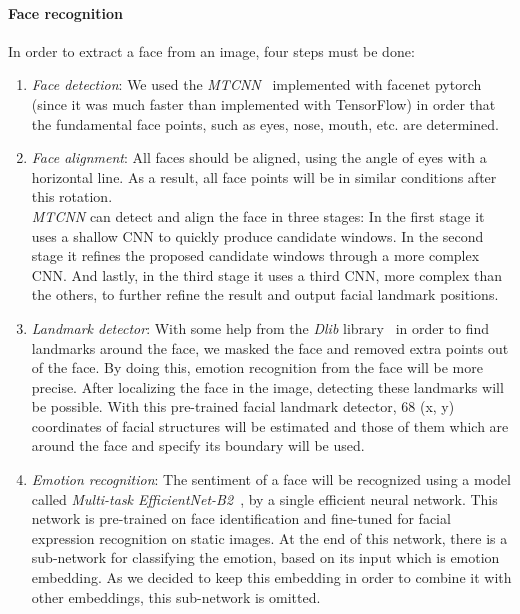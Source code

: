 \paragraph{Face recognition} In order to extract a face from an image, four steps must be done:

\begin{enumerate}
	\item\label{item:1}\emph{Face detection}: We used the \textit{MTCNN}~\cite{zhang2016joint} implemented with facenet pytorch (since it was much faster than implemented with TensorFlow) in order that the fundamental face points, such as eyes, nose, mouth, etc. are determined.
	\item\label{item:2}\emph{Face alignment}: All faces should be aligned, using the angle of eyes with a horizontal line. As a result, all face points will be in similar conditions after this rotation.\\\textit{MTCNN} can detect and align the face in three stages: In the first stage it uses a shallow CNN to quickly produce candidate windows. In the second stage it refines the proposed candidate windows through a more complex CNN. And lastly, in the third stage it uses a third CNN, more complex than the others, to further refine the result and output facial landmark positions.
	\item\label{item:3}\emph{Landmark detector}: With some help from the \textit{Dlib} library~\cite{kazemi2014one} in order to find landmarks around the face, we masked the face and removed extra points out of the face. By doing this, emotion recognition from the face will be more precise. After localizing the face in the image, detecting these landmarks will be possible. With this pre-trained facial landmark detector, 68 (x, y) coordinates of facial structures will be estimated and those of them which are around the face and specify its boundary will be used.
	\item\label{item:4}\emph{Emotion recognition}: The sentiment of a face will be recognized using a model called \textit{Multi-task EfficientNet-B2}~\cite{savchenko2022classifying}, by a single efficient neural network. This network is pre-trained on face identification and fine-tuned for facial expression recognition on static images. At the end of this network, there is a sub-network for classifying the emotion, based on its input which is emotion embedding. As we decided to keep this embedding in order to combine it with other embeddings, this sub-network is omitted. 
\end{enumerate}

